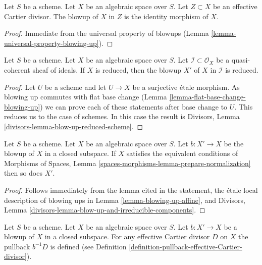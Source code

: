 \begin{lemma}
\label{lemma-blow-up-effective-Cartier-divisor}
Let $S$ be a scheme. Let $X$ be an algebraic space over $S$.
Let $Z \subset X$ be an effective Cartier divisor.
The blowup of $X$ in $Z$ is the identity morphism of $X$.
\end{lemma}

\begin{proof}
Immediate from the universal property of blowups
(Lemma \ref{lemma-universal-property-blowing-up}).
\end{proof}

\begin{lemma}
\label{lemma-blow-up-reduced-space}
Let $S$ be a scheme. Let $X$ be an algebraic space over $S$.
Let $\mathcal{I} \subset \mathcal{O}_X$ be a
quasi-coherent sheaf of ideals. If $X$ is reduced, then the
blowup $X'$ of $X$ in $\mathcal{I}$ is reduced.
\end{lemma}

\begin{proof}
Let $U$ be a scheme and let $U \to X$ be a surjective \'etale morphism.
As blowing up commutes with flat base change
(Lemma \ref{lemma-flat-base-change-blowing-up})
we can prove each of these statements after base change to $U$.
This reduces us to the case of schemes.
In this case the result is
Divisors, Lemma \ref{divisors-lemma-blow-up-reduced-scheme}.
\end{proof}

\begin{lemma}
\label{lemma-blowup-finite-nr-irreducibles}
Let $S$ be a scheme. Let $X$ be an algebraic space over $S$. Let
$b : X' \to X$ be the blowup of $X$ in a closed subspace. If
$X$ satisfies the equivalent conditions of
Morphisms of Spaces, Lemma \ref{spaces-morphisms-lemma-prepare-normalization}
then so does $X'$.
\end{lemma}

\begin{proof}
Follows immediately from the lemma cited in the statement,
the \'etale local description of blowing ups in
Lemma \ref{lemma-blowing-up-affine}, and
Divisors, Lemma \ref{divisors-lemma-blow-up-and-irreducible-components}.
\end{proof}

\begin{lemma}
\label{lemma-blow-up-pullback-effective-Cartier}
Let $S$ be a scheme. Let $X$ be an algebraic space over $S$.
Let $b : X' \to X$ be a blowup of $X$ in a closed subspace.
For any effective Cartier divisor $D$ on $X$ the pullback
$b^{-1}D$ is defined (see Definition
\ref{definition-pullback-effective-Cartier-divisor}).
\end{lemma}

